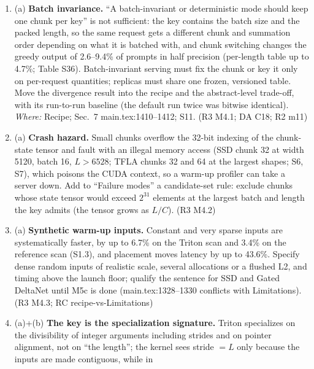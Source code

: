 \documentclass[11pt]{article}
\begin{document}
\begin{enumerate}[label=M7\alph*.]
  \item (a) \textbf{Batch invariance.} ``A batch-invariant or deterministic
        mode should keep one chunk per key'' is not sufficient: the key
        contains the batch size and the packed length, so the same request
        gets a different chunk and summation order depending on what it is
        batched with, and chunk switching changes the greedy output of
        2.6--9.4\% of prompts in half precision (per-length table up to
        4.7\%; Table S36). Batch-invariant serving must fix the chunk or key
        it only on per-request quantities; replicas must share one frozen,
        versioned table. Move the divergence result into the recipe and the
        abstract-level trade-off, with its run-to-run baseline (the default
        run twice was bitwise identical). \emph{Where:} Recipe; Sec.~7
        main.tex:1410--1412; S11. (R3 M4.1; DA C18; R2 m11)
  \item (a) \textbf{Crash hazard.} Small chunks overflow the 32-bit indexing
        of the chunk-state tensor and fault with an illegal memory access (SSD
        chunk 32 at width 5120, batch 16, $L>6528$; TFLA chunks 32 and 64 at
        the largest shapes; S6, S7), which poisons the CUDA context, so a
        warm-up profiler can take a server down. Add to ``Failure modes'' a
        candidate-set rule: exclude chunks whose state tensor would exceed
        $2^{31}$ elements at the largest batch and length the key admits (the
        tensor grows as $L/C$). (R3 M4.2)
  \item (a) \textbf{Synthetic warm-up inputs.} Constant and very sparse
        inputs are systematically faster, by up to 6.7\% on the Triton scan
        and 3.4\% on the reference scan (S1.3), and placement moves latency by
        up to 43.6\%. Specify dense random inputs of realistic scale, several
        allocations or a flushed L2, and timing above the launch floor;
        qualify the sentence for SSD and Gated DeltaNet until M5c is done
        (main.tex:1328--1330 conflicts with Limitations). (R3 M4.3; RC
        recipe-vs-Limitations)
  \item (a)+(b) \textbf{The key is the specialization signature.} Triton
        specializes on the divisibility of integer arguments including
        strides and on pointer alignment, not on ``the length''; the kernel
        sees stride $=L$ only because the inputs are made contiguous, while in

\end{enumerate}
\end{document}
